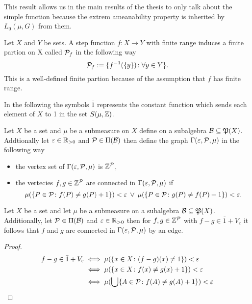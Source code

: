 This result allows us in the main results of the thesis to only talk about the simple function because the extrem ameanability property is inherited by $L_0(\mu, G)$ from them.

\begin{defin}
  Let $X$ and $Y$ be sets. A step function $f\colon X \to Y$ with finite range induces a finite partion on X called $\P_f$ in the following way
  \begin{equation*}
    \P_f := \{f^{-1}(\{y\})\colon \forall y \in Y\}.
  \end{equation*}
  This is a well-defined finite partion because of the assumption that $f$ has finite range.
\end{defin}

In the following the symbols $\bar{1}$ represents the constant function which sends each element of $X$ to 1 in the set $S(\mu, \Z)$. 

\begin{defin}
  Let $X$ be a set and $\mu$ be a submeasure on $X$ define on a subalgebra $\mathcal{B} \subseteq \PowS(X)$. Addtionally let $\varepsilon \in \R_{>0}$ and $\P \in \Pi(\mathcal{B})$ then define the graph $\Gamma(\varepsilon, \P, \mu)$ in the following way
  \begin{itemize}
    \item the vertex set of $\Gamma(\varepsilon, \P, \mu)$ is $\Z^\P$,
    \item the vertecies $f, g \in \Z^\P$ are connected in $\Gamma(\varepsilon, \P, \mu)$ if \[\mu(\{P \in \P\colon f(P) \neq g(P) + 1\}) < \varepsilon \: \lor \: \mu(\{P \in \P\colon g(P) \neq f(P) + 1\}) < \varepsilon.\]
  \end{itemize}
\end{defin}

\begin{lemma}\label{lem:1}
  Let $X$ be a set and let $\mu$ be a submeasure on a subalgebra $\mathcal{B} \subseteq \PowS(X)$. Additionally, let $\P \in \Pi(\mathcal{B})$ and $\varepsilon \in \R_{>0}$ then for $f,g \in \Z^\P$ with $f - g \in \bar{1} + V_\varepsilon$ it follows that $f$ and $g$ are connected in $\Gamma(\varepsilon, \P, \mu)$ by an edge.
\end{lemma}

\begin{proof}
  \begin{align*}
    f - g \in \bar{1} + V_\varepsilon   &\iff \mu(\{x \in X\colon (f-g)(x) \neq 1\}) < \varepsilon \\
                                      &\iff \mu(\{x \in X\colon f(x) \neq g(x) + 1\}) < \varepsilon \\
                                      &\iff \mu(\bigcup \{A \in \P \colon f(A) \neq g(A) + 1\}) < \varepsilon
  \end{align*}
\end{proof}

